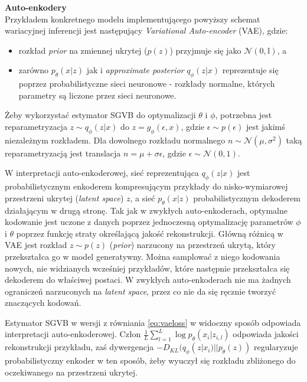 \documentclass[magisterska]{pracamgr}
\begin{document}

\noindent \textbf{Auto-enkodery} \\

Przykładem konkretnego modelu implementującego powyższy schemat wariacyjnej inferencji jest następujący \textit{Variational Auto-encoder} (VAE), gdzie:
\begin{itemize}
    \item rozkład \textit{prior} na zmiennej ukrytej ($p(z)$) przyjmuje się jako $\mathcal{N}(0, \mathbb{I})$, a
    \item zarówno $p_{\theta}(x|z)$ jak i \textit{approximate posterior} $q_{\phi}(z|x)$ reprezentuje się poprzez probabilistyczne sieci neuronowe - rozkłady normalne, których parametry są liczone przez sieci neuronowe.
\end{itemize}

Żeby wykorzystać estymator SGVB do optymalizacji $\theta$ i $\phi$, potrzebna jest reparametryzacja $z \sim q_{\phi}(z|x)$ do $z = g_{\phi}(\epsilon, x)$, gdzie $\epsilon \sim p(\epsilon)$ jest jakimś niezależnym rozkładem. Dla dowolnego rozkładu normalnego $n \sim \mathcal{N}(\mu, \sigma^2)$ taką reparametryzacją jest translacja $n = \mu + \sigma \epsilon$, gdzie $\epsilon \sim \mathcal{N}(0, 1)$.

W interpretacji auto-enkoderowej, sieć reprezentująca $q_{\phi}(z|x)$ jest probabilistycznym enkoderem kompresującym przykłady do nisko-wymiarowej przestrzeni ukrytej (\textit{latent space}) $z$, a sieć $p_{\theta}(x|z)$ probabilistycznym dekoderem działającym w drugą stronę. Tak jak w zwykłych auto-enkoderach, optymalne kodowanie jest uczone z danych poprzez jednoczesną optymalizację parametrów $\phi$ i $\theta$ poprzez funkcję straty określającą jakość rekonstrukcji. Główną różnicą w VAE jest rozkład $z \sim p(z)$ (\textit{prior}) narzucony na przestrzeń ukrytą, który przekształca go w model generatywny. Można samplować z niego kodowania nowych, nie widzianych wcześniej przykładów, które następnie przekształca się dekoderem do właściwej postaci. W zwykłych auto-enkoderach nie ma żadnych ograniczeń narzuconych na \textit{latent space}, przez co nie da się ręcznie tworzyć znaczących kodowań.

Estymator SGVB w wersji z równiania \ref{eq:vaeloss} w widoczny sposób odpowiada interpretacji auto-enkoderowej. Człon $\frac{1}{L} \sum_{l=1}^{L} \log p_{\theta}(x_i|z_{i,l})$ odpowiada jakości rekonstrukcji przykładu, zaś dywergencja $-D_{KL}(q_{\phi}(z|x_i) || p_{\theta}(z))$ regularyzuje probabilistyczny enkoder w ten sposób, żeby wyuczył się rozkładu zbliżonego do oczekiwanego na przestrzeni ukrytej.
\end{document}
